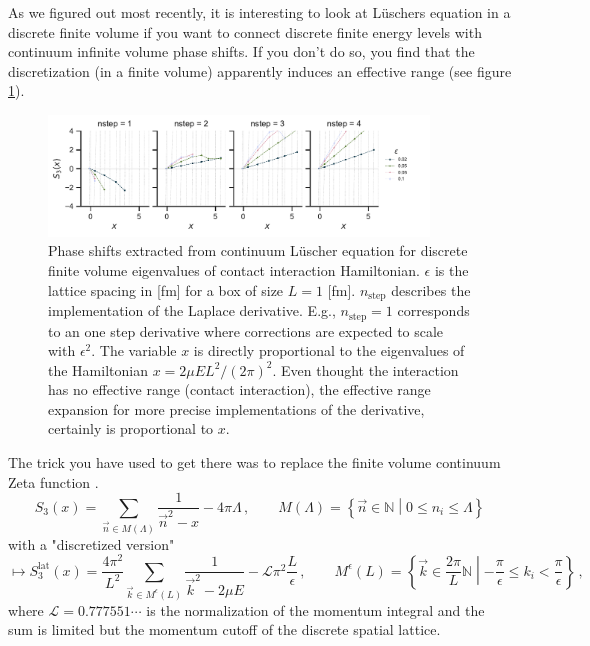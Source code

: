 \documentclass[
    aps,
    prl,
    showkeys,
    nofootinbib,
    floatfix
]{revtex4-1}
\begin{document}
As we figured out most recently, it is interesting to look at Lüschers equation in a discrete finite volume if you want to connect discrete finite energy levels with continuum infinite volume phase shifts.
If you don't do so, you find that the discretization (in a finite volume) apparently induces an effective range (see figure \ref{fig-cont-lusch}).
\begin{figure}[!htb]
\includegraphics[width=0.9\textwidth]{figs/eff-range-cont-lusch.pdf}
\caption{
    \label{fig-cont-lusch}Phase shifts extracted from continuum Lüscher equation for discrete finite volume eigenvalues of contact interaction Hamiltonian.
    $\epsilon$ is the lattice spacing in [fm] for a box of size $L = 1$ [fm].
    $n_{\mathrm{step}}$ describes the implementation of the Laplace derivative.
    E.g., $n_{\mathrm{step}} = 1$ corresponds to an one step derivative where corrections are expected to scale with $\epsilon^2$.
    The variable $x$ is directly proportional to the eigenvalues of the Hamiltonian $x = 2 \mu E L^2 / (2 \pi)^2$.
    Even thought the interaction has no effective range (contact interaction), the effective range expansion for more precise implementations of the derivative, certainly is proportional to $x$.
 }
\end{figure}

The trick you have used to get there was to replace the finite volume continuum Zeta function .
\begin{equation}
    S_3(x) = \sum\limits_{\vec n \in M(\Lambda)} \frac{1}{\vec n ^2 - x} - 4 \pi \Lambda
    \, , \qquad
    M(\Lambda) = \left\{ \vec n \in \mathbb N \middle\vert 0 \leq n_i \leq \Lambda \right\}
\end{equation}
with a "discretized version"
\begin{equation}
    \mapsto
    S_3^{\mathrm{lat}}(x) = \frac{4 \pi^2}{L^2} \sum\limits_{\vec k \in M^\epsilon(L)} \frac{1}{\vec k ^2 - 2 \mu E} - \mathcal L \pi^2 \frac{L}{\epsilon}
    \, , \qquad
    M^\epsilon(L) = \left\{ \vec k \in \frac{2 \pi}{L} \mathbb N \middle\vert - \frac{\pi}{\epsilon} \leq k_i < \frac{\pi}{\epsilon} \right\}
    \, ,
\end{equation}
where $\mathcal L = 0.777551 \cdots$ is the normalization of the momentum integral and the sum is limited but the momentum cutoff of the discrete spatial lattice.
\end{document}
